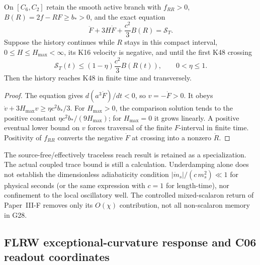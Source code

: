 \documentclass[12pt,a4paper]{article}
\begin{document}
\begin{theorem}
\label{p8:thm:v2109-subcritical-trace-reach}
On \([C_6,C_2]\) retain the smooth active branch with \(f_{RR}>0\),
\(B(R)=2f-RF\ge b_*>0\), and the exact equation
\[
 \ddot F+3H\dot F+\frac{c^2}{3}B(R)=\mathcal S_T.
\]
Suppose the history continues while \(R\) stays in this compact interval,
\(0\le H\le H_{\max}<\infty\), its K16 velocity is negative, and until
the first K48 crossing
\[
 \mathcal S_T(t)\le(1-\eta)\frac{c^2}{3}B(R(t)),\qquad 0<\eta\le1.
\]
Then the history reaches K48 in finite time and transversely.
\end{theorem}
\begin{proof}
The equation gives \(d(a^3\dot F)/dt<0\), so \(v=-\dot F>0\).
It obeys \(\dot v+3H_{\max}v\ge\eta c^2b_*/3\).
For \(H_{\max}>0\), the comparison solution tends to the positive
constant \(\eta c^2b_*/(9H_{\max})\); for \(H_{\max}=0\) it grows
linearly.  A positive eventual lower bound on \(v\) forces traversal of
the finite \(F\)-interval in finite time.  Positivity of \(f_{RR}\)
converts the negative \(\dot F\) at crossing into a nonzero \(\dot R\).
\end{proof}
The source-free/effectively traceless reach result is retained as a
specialization.  The actual coupled trace bound is still a calculation.
Underdamping alone does not establish the dimensionless adiabaticity
condition \(|\dot m_s|/(c\,m_s^2)\ll1\) for physical seconds (or the
same expression with \(c=1\) for length-time), nor confinement
to the local oscillatory well.  The controlled mixed-scalaron
return of Paper~III-F removes only its \(O(\chi)\) contribution, not
all non-scalaron memory in G28.




\subsection{FLRW exceptional-curvature response and C06 readout coordinates}
\label{p8:sec:v2185-flrw-e6-curvature-response}
\end{document}
